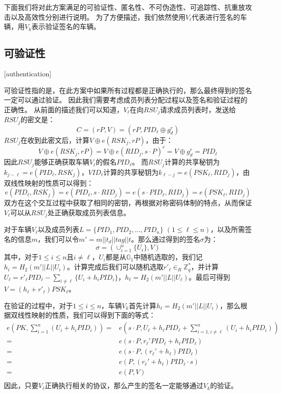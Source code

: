 下面我们将对此方案满足的可验证性、匿名性、不可伪造性、可追踪性、抗重放攻击以及高效性分别进行说明。
为了方便描述，我们依然使用$V_\ell$代表进行签名的车辆，用$V_k$表示验证签名的车辆。

\subsection{可验证性}[authentication]

可验证性指的是，在此方案中如果所有过程都是正确执行的，那么最终得到的签名一定可以通过验证。
因此我们需要考虑成员列表分配过程以及签名和验证过程的正确性。
从前面的描述我们可以知道，$V_\ell$在向$RSU_j$请求成员列表时，发送给$RSU_j$的密文是：
\begin{equation}
C=(rP,V)=(rP,PID_\ell\oplus g_d^r)
\end{equation}
$RSU_j$在收到此密文后，计算$V\oplus e(RSK_j,rP)$，由于：
\begin{equation}
V\oplus e(RSK_j,rP)=V\oplus e(RID_j,s\cdot P)^r=V\oplus g_d^r=PID_\ell
\end{equation}
因此$RSU_j$能够正确获取车辆$V_\ell$的假名$PID_\ell$。
而$RSU_j$计算的共享秘钥为$k_{j-\ell}=e(PID_\ell,RSK_j)$，$VID_\ell$计算的共享秘钥为$k_{\ell-j}=e(PSK_\ell,RID_j)$，由双线性映射的性质可以得到：
\begin{equation}
e(PID_\ell,RSK_j)=e(PID_\ell,s\cdot RID_j)=e(s\cdot PID_\ell,RID_j)=e(PSK_\ell,RID_j)
\end{equation}
双方在这个交互过程中获取了相同的密钥，再根据对称密码体制的特点，从而保证$V_\ell$可以从$RSU_j$处正确获取成员列表信息。

对于车辆$V_\ell$以及成员列表$L=\{PID_1,PID_2,...,PID_n\}$ $(1\leq \ell\leq n)$，以及所需签名的信息$m$，我们可以令$m'=m||t_d||tag||t$。那么通过得到的签名$\sigma$为：
\begin{equation}
\sigma=(\cup_{i=1}^n\{U_i\},V)
\end{equation}
其中，对于$1\leq i\leq n$且$i\neq \ell$，$U_i$都是从$\mathbb{G}_1$中随机选取的，我们记$h_i=H_2(m'||L||U_i)$。计算完成后我们可以随机选取$r'_\ell \in_R\mathbb{Z}_q^*$，并计算$U_\ell=r'_\ell PID_\ell-\sum_{i\neq \ell}\{U_i+h_iPID_i\}$，$h_\ell=H_2(m'||L||U_\ell)$。最后可得到$V=(h_\ell+r'_\ell)PSK_\ell$。

在验证的过程中，对于$1\leq i \leq n$，车辆$V_k$首先计算$h_\ell=H_2(m'||L||U_i)$，那么根据双线性映射的性质，我们可以得到下面的等式：
\begin{equation}
\begin{split}
e(PK,\sum_{i=1}^n(U_i+h_iPID_i)) = & e(s\cdot P,U_\ell+h_\ell PID_\ell+\sum_{i=1,i\neq \ell}^n(U_i+h_iPID_i)) \\
 = & e(s\cdot P,r_\ell'PID_\ell+h_\ell PID_\ell)  \\
 = & e(s\cdot P,(r_\ell'+h_\ell)PID_\ell) \\
 = & e(P,(r_\ell'+h_\ell)PID_\ell\cdot s) \\
 = & e(P,V) \\
\end{split}
\end{equation}
因此，只要$V_\ell$正确执行相关的协议，那么产生的签名一定能够通过$V_k$的验证。

